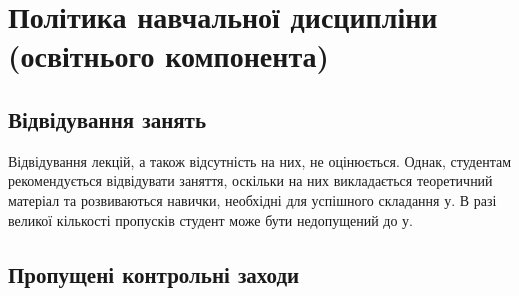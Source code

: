 \documentclass{Syllabus}
\begin{document}
%

\clearpage


\section{Політика навчальної дисципліни (освітнього компонента)}


\subsection*{Відвідування занять}
Відвідування лекцій, а також відсутність на них, не оцінюється. Однак, студентам рекомендується відвідувати заняття, оскільки на них викладається теоретичний матеріал та розвиваються навички, необхідні для успішного складання \control у. В разі великої кількості пропусків студент може бути недопущений до \control у.

\subsection*{Пропущені контрольні заходи}
\end{document}
